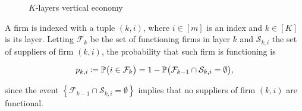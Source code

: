 \documentclass[../../main.tex]{subfiles}
\begin{document}
\begin{figure}[H]
  \centering
  \caption{$K$-layers vertical economy}
  \label{fig:vertical-economy-diagram}
\end{figure}

A firm is indexed with a tuple $(k, i)$, where $i \in [m]$ is an index and $k \in [K]$ is its layer. Letting $\mathcal{F}_k$ be the set of functioning firms in layer $k$ and $\mathcal{S}_{k, i}$ the set of suppliers of firm $(k, i)$, the probability that such firm is functioning is

\begin{equation} \label{eq:functional_probability}
  p_{k, i} \coloneqq \P\big( i \in \mathcal{F}_k \big) = 1 - \P\big( \mathcal{F}_{k - 1} \cap \mathcal{S}_{k, i} = \emptyset \big),
\end{equation}

since the event $\left\{ \mathcal{F}_{k - 1} \cap \mathcal{S}_{k, i} = \emptyset \right\}$ implies that no suppliers of firm $(k, i)$ are functional.
\end{document}
